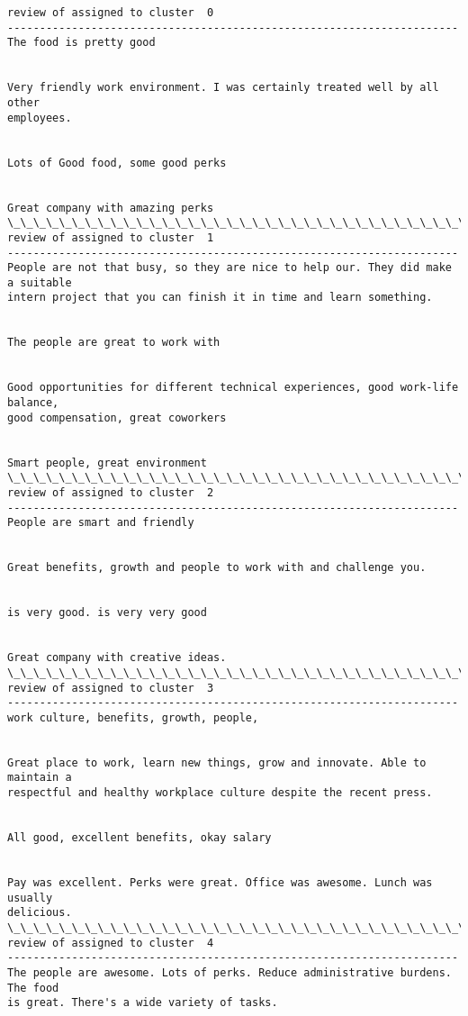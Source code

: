 \documentclass[11pt]{article}
\begin{document}
    \begin{Verbatim}[commandchars=\\\{\}]
review of assigned to cluster  0
----------------------------------------------------------------------
The food is pretty good


Very friendly work environment. I was certainly treated well by all other
employees.


Lots of Good food, some good perks


Great company with amazing perks
\_\_\_\_\_\_\_\_\_\_\_\_\_\_\_\_\_\_\_\_\_\_\_\_\_\_\_\_\_\_\_\_\_\_\_\_\_\_\_\_\_\_\_\_\_\_\_\_\_\_\_\_\_\_\_\_\_\_\_\_\_\_\_\_\_\_\_\_\_\_
review of assigned to cluster  1
----------------------------------------------------------------------
People are not that busy, so they are nice to help our. They did make a suitable
intern project that you can finish it in time and learn something.


The people are great to work with


Good opportunities for different technical experiences, good work-life balance,
good compensation, great coworkers


Smart people, great environment
\_\_\_\_\_\_\_\_\_\_\_\_\_\_\_\_\_\_\_\_\_\_\_\_\_\_\_\_\_\_\_\_\_\_\_\_\_\_\_\_\_\_\_\_\_\_\_\_\_\_\_\_\_\_\_\_\_\_\_\_\_\_\_\_\_\_\_\_\_\_
review of assigned to cluster  2
----------------------------------------------------------------------
People are smart and friendly


Great benefits, growth and people to work with and challenge you.


is very good. is very very good


Great company with creative ideas.
\_\_\_\_\_\_\_\_\_\_\_\_\_\_\_\_\_\_\_\_\_\_\_\_\_\_\_\_\_\_\_\_\_\_\_\_\_\_\_\_\_\_\_\_\_\_\_\_\_\_\_\_\_\_\_\_\_\_\_\_\_\_\_\_\_\_\_\_\_\_
review of assigned to cluster  3
----------------------------------------------------------------------
work culture, benefits, growth, people,


Great place to work, learn new things, grow and innovate. Able to maintain a
respectful and healthy workplace culture despite the recent press.


All good, excellent benefits, okay salary


Pay was excellent. Perks were great. Office was awesome. Lunch was usually
delicious.
\_\_\_\_\_\_\_\_\_\_\_\_\_\_\_\_\_\_\_\_\_\_\_\_\_\_\_\_\_\_\_\_\_\_\_\_\_\_\_\_\_\_\_\_\_\_\_\_\_\_\_\_\_\_\_\_\_\_\_\_\_\_\_\_\_\_\_\_\_\_
review of assigned to cluster  4
----------------------------------------------------------------------
The people are awesome. Lots of perks. Reduce administrative burdens. The food
is great. There's a wide variety of tasks.



\end{Verbatim}
\end{document}
